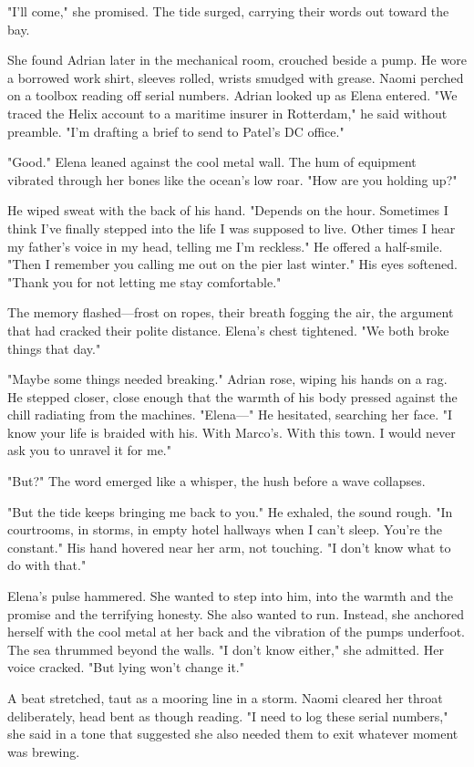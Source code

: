 "I'll come," she promised. The tide surged, carrying their words out toward the bay.

She found Adrian later in the mechanical room, crouched beside a pump. He wore a borrowed work shirt, sleeves rolled, wrists smudged with grease. Naomi perched on a toolbox reading off serial numbers. Adrian looked up as Elena entered. "We traced the Helix account to a maritime insurer in Rotterdam," he said without preamble. "I'm drafting a brief to send to Patel's DC office."

"Good." Elena leaned against the cool metal wall. The hum of equipment vibrated through her bones like the ocean's low roar. "How are you holding up?"

He wiped sweat with the back of his hand. "Depends on the hour. Sometimes I think I've finally stepped into the life I was supposed to live. Other times I hear my father's voice in my head, telling me I'm reckless." He offered a half-smile. "Then I remember you calling me out on the pier last winter." His eyes softened. "Thank you for not letting me stay comfortable."

The memory flashed—frost on ropes, their breath fogging the air, the argument that had cracked their polite distance. Elena's chest tightened. "We both broke things that day."

"Maybe some things needed breaking." Adrian rose, wiping his hands on a rag. He stepped closer, close enough that the warmth of his body pressed against the chill radiating from the machines. "Elena—" He hesitated, searching her face. "I know your life is braided with his. With Marco's. With this town. I would never ask you to unravel it for me."

"But?" The word emerged like a whisper, the hush before a wave collapses.

"But the tide keeps bringing me back to you." He exhaled, the sound rough. "In courtrooms, in storms, in empty hotel hallways when I can't sleep. You're the constant." His hand hovered near her arm, not touching. "I don't know what to do with that."

Elena's pulse hammered. She wanted to step into him, into the warmth and the promise and the terrifying honesty. She also wanted to run. Instead, she anchored herself with the cool metal at her back and the vibration of the pumps underfoot. The sea thrummed beyond the walls. "I don't know either," she admitted. Her voice cracked. "But lying won't change it."

A beat stretched, taut as a mooring line in a storm. Naomi cleared her throat deliberately, head bent as though reading. "I need to log these serial numbers," she said in a tone that suggested she also needed them to exit whatever moment was brewing.

